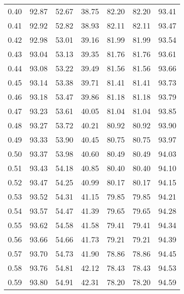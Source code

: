\begin{tabular}{|c|c|c|c|c|c|c|}
      0.40 &     92.87 &     52.67 &      38.75 &   82.20 &      82.20 &         93.41 \\
      0.41 &     92.92 &     52.82 &      38.93 &   82.11 &      82.11 &         93.47 \\
      0.42 &     92.98 &     53.01 &      39.16 &   81.99 &      81.99 &         93.54 \\
      0.43 &     93.04 &     53.13 &      39.35 &   81.76 &      81.76 &         93.61 \\
      0.44 &     93.08 &     53.22 &      39.49 &   81.56 &      81.56 &         93.66 \\
      0.45 &     93.14 &     53.38 &      39.71 &   81.41 &      81.41 &         93.73 \\
      0.46 &     93.18 &     53.47 &      39.86 &   81.18 &      81.18 &         93.79 \\
      0.47 &     93.23 &     53.61 &      40.05 &   81.04 &      81.04 &         93.85 \\
      0.48 &     93.27 &     53.72 &      40.21 &   80.92 &      80.92 &         93.90 \\
      0.49 &     93.33 &     53.90 &      40.45 &   80.75 &      80.75 &         93.97 \\
      0.50 &     93.37 &     53.98 &      40.60 &   80.49 &      80.49 &         94.03 \\
      0.51 &     93.43 &     54.18 &      40.85 &   80.40 &      80.40 &         94.10 \\
      0.52 &     93.47 &     54.25 &      40.99 &   80.17 &      80.17 &         94.15 \\
      0.53 &     93.52 &     54.31 &      41.15 &   79.85 &      79.85 &         94.21 \\
      0.54 &     93.57 &     54.47 &      41.39 &   79.65 &      79.65 &         94.28 \\
      0.55 &     93.62 &     54.58 &      41.58 &   79.41 &      79.41 &         94.34 \\
      0.56 &     93.66 &     54.66 &      41.73 &   79.21 &      79.21 &         94.39 \\
      0.57 &     93.70 &     54.73 &      41.90 &   78.86 &      78.86 &         94.45 \\
      0.58 &     93.76 &     54.81 &      42.12 &   78.43 &      78.43 &         94.53 \\
      0.59 &     93.80 &     54.91 &      42.31 &   78.20 &      78.20 &         94.59 \\

\end{tabular}
